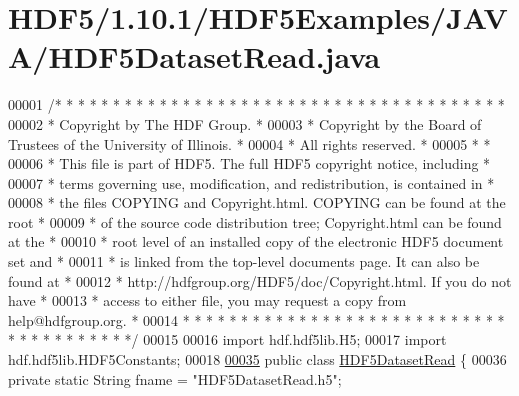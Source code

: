 \hypertarget{_h_d_f5_21_810_81_2_h_d_f5_examples_2_j_a_v_a_2_h_d_f5_dataset_read_8java_source}{}\section{H\+D\+F5/1.10.1/\+H\+D\+F5\+Examples/\+J\+A\+V\+A/\+H\+D\+F5\+Dataset\+Read.java}
\label{_h_d_f5_21_810_81_2_h_d_f5_examples_2_j_a_v_a_2_h_d_f5_dataset_read_8java_source}

\begin{DoxyCode}
00001 \textcolor{comment}{/* * * * * * * * * * * * * * * * * * * * * * * * * * * * * * * * * * * * * * *}
00002 \textcolor{comment}{ * Copyright by The HDF Group.                                               *}
00003 \textcolor{comment}{ * Copyright by the Board of Trustees of the University of Illinois.         *}
00004 \textcolor{comment}{ * All rights reserved.                                                      *}
00005 \textcolor{comment}{ *                                                                           *}
00006 \textcolor{comment}{ * This file is part of HDF5.  The full HDF5 copyright notice, including     *}
00007 \textcolor{comment}{ * terms governing use, modification, and redistribution, is contained in    *}
00008 \textcolor{comment}{ * the files COPYING and Copyright.html.  COPYING can be found at the root   *}
00009 \textcolor{comment}{ * of the source code distribution tree; Copyright.html can be found at the  *}
00010 \textcolor{comment}{ * root level of an installed copy of the electronic HDF5 document set and   *}
00011 \textcolor{comment}{ * is linked from the top-level documents page.  It can also be found at     *}
00012 \textcolor{comment}{ * http://hdfgroup.org/HDF5/doc/Copyright.html.  If you do not have          *}
00013 \textcolor{comment}{ * access to either file, you may request a copy from help@hdfgroup.org.     *}
00014 \textcolor{comment}{ * * * * * * * * * * * * * * * * * * * * * * * * * * * * * * * * * * * * * * */}
00015 
00016 \textcolor{keyword}{import} hdf.hdf5lib.H5;
00017 \textcolor{keyword}{import} hdf.hdf5lib.HDF5Constants;
00018 
\hyperlink{class_h_d_f5_dataset_read}{00035} \textcolor{keyword}{public} \textcolor{keyword}{class }\hyperlink{class_h_d_f5_dataset_read}{HDF5DatasetRead} \{
00036     \textcolor{keyword}{private} \textcolor{keyword}{static} String fname  = \textcolor{stringliteral}{"HDF5DatasetRead.h5"};

\end{DoxyCode}
